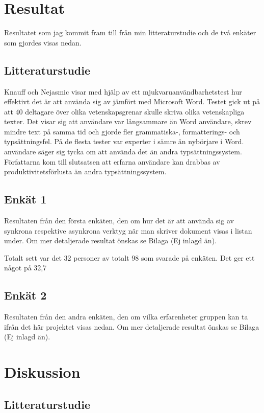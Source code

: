 \section{Resultat}
\label{sec:results-tuhkala}
Resultatet som jag kommit fram till från min litteraturstudie och de två enkäter som gjordes visas nedan.

\subsection{Litteraturstudie}
Knauff och Nejasmic \cite{knauff2014efficiency} visar med hjälp av ett mjukvaruanvändbarhetstest hur effektivt det är att använda sig av \latex jämfört med Microsoft Word. Testet gick ut på att 40 deltagare över olika vetenskapsgrenar skulle skriva olika vetenskapliga texter.
Det visar sig att \latex användare var långsammare än Word användare, skrev mindre text på samma tid och gjorde fler grammatiska-, formatterings- och typsättningsfel. På de flesta tester var experter i \latex sämre än nybörjare i Word. \latex användare säger sig tycka om att använda det än andra typsättningssystem. Författarna kom till slutsatsen att erfarna \latex användare kan drabbas av produktivitetsförlusta än andra typsättningssystem.



\subsection{Enkät 1}
Resultaten från den första enkäten, den om hur det är att använda sig av synkrona respektive asynkrona verktyg när man skriver dokument visas i listan under. Om mer detaljerade resultat önskas se Bilaga (Ej inlagd än).

Totalt sett var det 32 personer av totalt 98 som svarade på enkäten. Det ger ett något på 32,7%

\subsection{Enkät 2}
Resultaten från den andra enkäten, den om vilka erfarenheter gruppen kan ta ifrån det här projektet visas nedan. Om mer detaljerade resultat önskas se Bilaga (Ej inlagd än).

\section{Diskussion}
\label{sec:discussion-tuhkala}

\subsection{Litteraturstudie}

